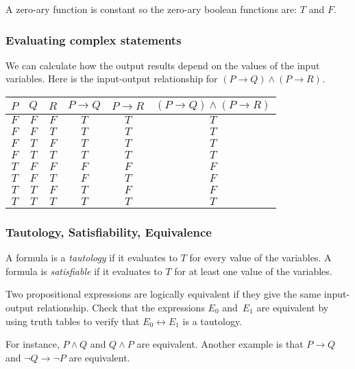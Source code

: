 \documentclass[10pt,t]{beamer}
\begin{document}
\begin{frame}
\pause
\bigskip
A zero-ary function is constant so the zero-ary boolean functions are:
$T$ and $F$.
\end{frame}




\begin{frame}
  \frametitle{Evaluating complex statements}
  We can calculate how the output results 
  depend on the values of the input variables.
  \pause
  Here is the input-output relationship for
  $(P\rightarrow Q)\wedge (P\rightarrow R)$.
  \begin{center}
    \begin{tabular}{ccc|ccc}
      $P$  &$Q$  &$R$ &$P\rightarrow Q$ &$P\rightarrow R$ &$(P\rightarrow Q)\wedge (P\rightarrow R)$  \\ \hline
      $F$  &$F$  &$F$  &$T$  &$T$  &$T$   \\
      $F$  &$F$  &$T$  &$T$  &$T$  &$T$   \\
      $F$  &$T$  &$F$  &$T$  &$T$  &$T$   \\
      $F$  &$T$  &$T$  &$T$  &$T$  &$T$   \\
      $T$  &$F$  &$F$  &$F$  &$F$  &$F$   \\
      $T$  &$F$  &$T$  &$F$  &$T$  &$F$   \\
      $T$  &$T$  &$F$  &$T$  &$F$  &$F$   \\
      $T$  &$T$  &$T$  &$T$  &$T$  &$T$      
    \end{tabular}
  \end{center}
\end{frame}




\begin{frame}
  \frametitle{Tautology, Satisfiability, Equivalence}
  A formula is a \emph{tautology} if it evaluates to $T$ for every value
  of the variables.
  A formula is \emph{satisfiable} if it evaluates to $T$ for at least one
  value of the variables.

  \pause
  Two propositional expressions are \alert{logically equivalent} if they
  give the same input-output relationship. 
  Check that the expressions 
  $E_0$ and~$E_1$ are equivalent by using truth tables to
  verify that  
  $E_0\leftrightarrow E_1$ is a tautology.  

  For instance, $P\wedge Q$ and $Q\wedge P$ are equivalent.
  Another example is that $P\rightarrow Q$ and $\neg Q\rightarrow \neg P$ 
  are equivalent.
\end{frame}
\end{document}

